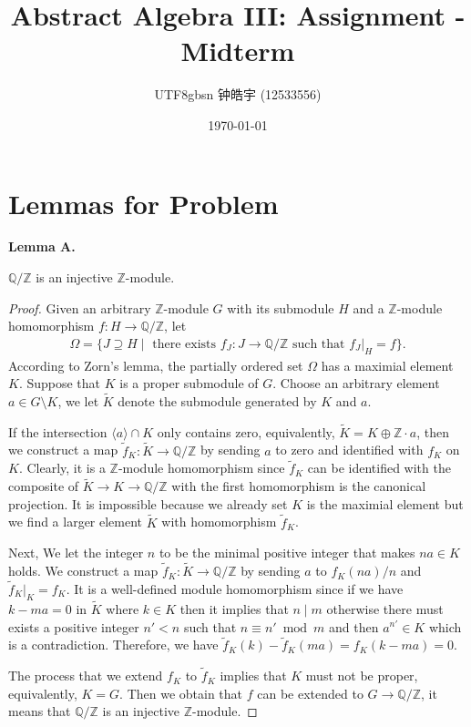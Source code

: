 \documentclass[12pt, a4paper]{article}
\title{Abstract Algebra III: Assignment - Midterm}
\author{
    \begin{CJK*}{UTF8}{gbsn}
    钟皓宇 (12533556)
    \end{CJK*}
}
\date{\today}
\newcommand{\qz}{\mathbb{Q}/\mathbb{Z}}
\newcommand{\z}{\mathbb{Z}}
\theoremstyle{remark}
\newenvironment{lemma}[1]{
    \noindent \textbf{Lemma #1.} \itshape
}{
    \vspace{1em}
}
\begin{document}
\maketitle


\section*{Lemmas for Problem}
\begin{lemma}{A}
     $\qz$ is an injective $\z$-module.
\end{lemma}
\begin{proof}
    Given an arbitrary $\mathbb{Z}$-module $G$ with its submodule $H$ and a $\mathbb{Z}$-module homomorphism $f:H\to \qz$, let 
    \begin{align*}
        \Omega=\{J\supseteq H\mid \text{ there exists $f_J:J\to \qz$ such that $f_J|_{H}=f$}\}.
    \end{align*}
    According to Zorn's lemma, the partially ordered set $\Omega$ has a maximial element $K$.
    Suppose that $K$ is a proper submodule of $G$.
    Choose an arbitrary element $a\in G\setminus K$, we let $\tilde{K}$ denote the submodule generated by $K$ and $a$.
    
    If the intersection $\langle a \rangle\cap K$ only contains zero, equivalently, $\tilde{K}= K\oplus \mathbb{Z}\cdot a$, then we construct a map $\tilde{f}_K:\tilde{K}\to \qz$  
    by sending $a$ to zero and identified with $f_K$ on $K$. Clearly, it is a $\mathbb{Z}$-module homomorphism since $\tilde{f}_K$ can be identified with the composite of $\tilde{K}\to K \to \qz$ with the first homomorphism is the canonical projection.
    It is impossible because we already set $K$ is the maximial element but we find a larger element $\tilde{K}$ with homomorphism $\tilde{f}_K$.
    
    Next, We let the integer $n$ to be the minimal positive integer that makes $na\in K$ holds. We construct a map $\tilde{f}_K:\tilde{K}\to \qz$ by sending $a$ to $f_K(na)/n$ and $\tilde{f}_K|_K = f_K$. 
    It is a well-defined module homomorphism since if we have $k-ma=0$ in $\tilde{K}$ where $k\in K$ then it implies that $n\mid m $ otherwise there must exists a positive integer $n'<n$ such that $n\equiv n'\bmod m$ and then $a^{n'}\in K$ which is a contradiction.
    Therefore, we have $\tilde{f}_K(k)-\tilde{f}_K(ma)= f_K(k-ma)=0$. 
    
    The process that we extend $f_K$ to $\tilde{f}_K$ implies that $K$ must not be proper, equivalently, $K=G$.
    Then we obtain that $f$ can be extended to $G\to\qz$, it means that $\qz$ is an injective $\mathbb{Z}$-module.
\end{proof}
\end{document}
